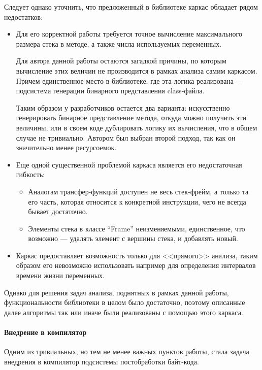 Следует однако уточнить, что предложенный в библиотеке каркас обладает рядом недостатков:
\begin{itemize}
    \item Для его корректной работы требуется точное вычисление максимального размера стека
    в методе, а также числа используемых переменных.

    Для автора данной работы остаются загадкой причины, по которым вычисление этих величин
    не производится в рамках анализа самим каркасом.
    Причем единственное место в библиотеке, где эта логика реализована --- подсистема генерации
    бинарного представления class-файла.

    Таким образом у разработчиков остается два варианта: искусственно генерировать бинарное
    представление метода, откуда можно получить эти величины, или в своем коде дублировать логику
    их вычисления, что в общем случае не тривиально.
    Автором был выбран второй подход, так как он значительно менее ресурсоемок.

    \item Еще одной существенной проблемой каркаса является его недостаточная гибкость:
    \begin{itemize}
        \item Аналогам трансфер-функций доступен не весь стек-фрейм, а только та его часть,
        которая относится к конкретной инструкции, чего не всегда бывает достаточно.

        \item Элементы стека в классе ``Frame'' неизменяемыми, единственное, что возможно ---
        удалять элемент с вершины стека, и добавлять новый.
    \end{itemize}

    \item Каркас предоставляет возможность только для <<прямого>> анализа, таким образом его
    невозможно использовать например для определения интервалов времени жизни переменных.
\end{itemize}

Однако для решения задач анализа, поднятных в рамках данной работы, функциональности библиотеки
в целом было достаточно, поэтому описанные далее алгоритмы так или иначе были реализованы
с помощью этого каркаса.

\paragraph{Внедрение в компилятор}
Одним из тривиальных, но тем не менее важных пунктов работы, стала задача внедрения в компилятор
подсистемы постобработки байт-кода.

